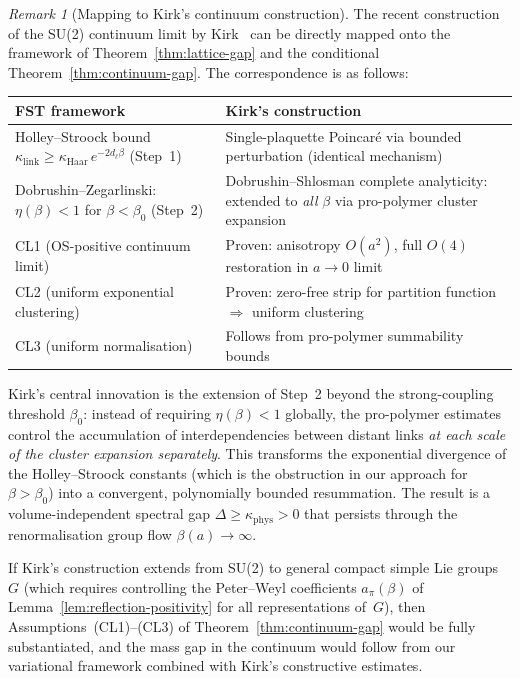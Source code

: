 \documentclass[12pt,a4paper]{article}
\theoremstyle{definition}
\theoremstyle{plain}
\theoremstyle{remark}
\newtheorem{remark}[definition]{Remark}
\begin{document}
\begin{remark}[Mapping to Kirk's continuum construction]\label{rem:kirk-mapping}
The recent construction of the SU(2) continuum limit by
Kirk~\cite{Kirk2026,Kirk2026b} can be directly mapped onto the framework
of Theorem~\ref{thm:lattice-gap} and the conditional
Theorem~\ref{thm:continuum-gap}. The correspondence is as follows:

\begin{center}
\begin{tabular}{p{4.8cm}p{5.2cm}}
\hline
\textbf{FST framework} & \textbf{Kirk's construction} \\
\hline
Holley--Stroock bound $\kappa_{\mathrm{link}} \geq \kappa_{\mathrm{Haar}}\,
e^{-2 d_\ell \beta}$ (Step~1)
& Single-plaquette Poincar\'e via bounded perturbation
  (identical mechanism) \\[4pt]
Dobrushin--Zegarlinski: $\eta(\beta) < 1$ for $\beta < \beta_0$ (Step~2)
& Dobrushin--Shlosman complete analyticity:
  extended to \emph{all} $\beta$ via pro-polymer
  cluster expansion \\[4pt]
CL1 (OS-positive continuum limit)
& Proven: anisotropy $O(a^2)$, full $O(4)$
  restoration in $a \to 0$ limit \\[4pt]
CL2 (uniform exponential clustering)
& Proven: zero-free strip for partition function
  $\Rightarrow$ uniform clustering \\[4pt]
CL3 (uniform normalisation)
& Follows from pro-polymer summability bounds \\
\hline
\end{tabular}
\end{center}

\noindent
Kirk's central innovation is the extension of Step~2 beyond the
strong-coupling threshold $\beta_0$: instead of requiring $\eta(\beta) < 1$
globally, the pro-polymer estimates control the accumulation of
interdependencies between distant links \emph{at each scale of the
cluster expansion separately}. This transforms the exponential
divergence of the Holley--Stroock constants (which is the obstruction
in our approach for $\beta > \beta_0$) into a convergent,
polynomially bounded resummation. The result is a volume-independent
spectral gap $\Delta \geq \kappa_{\mathrm{phys}} > 0$ that persists
through the renormalisation group flow $\beta(a) \to \infty$.

If Kirk's construction extends from SU(2) to general compact simple
Lie groups $G$ (which requires controlling the Peter--Weyl coefficients
$a_\pi(\beta)$ of Lemma~\ref{lem:reflection-positivity} for all
representations of~$G$), then Assumptions~(CL1)--(CL3) of
Theorem~\ref{thm:continuum-gap} would be fully substantiated, and the
mass gap in the continuum would follow from our variational framework
combined with Kirk's constructive estimates.
\end{remark}
\end{document}
